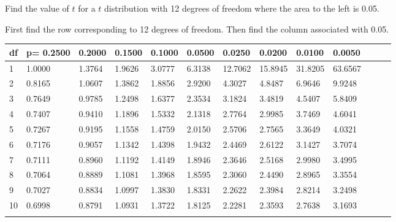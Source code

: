 \begin{frame}{\small Find the value of $t$ for a $t$ distribution with
    12 degrees of freedom where the area to the left is 0.05.}
  
{\small First find the row corresponding to 12 degrees of freedom. Then
find the column associated with 0.05.}

  {
\fontsize{5pt}{5pt}
\selectfont
\begin{tabular}{l|llll>{\columncolor{light-blue}}llllllll} 
df  & p= 0.2500  &  0.2000  &  0.1500  &  0.1000  &  0.0500  &  0.0250  &  0.0200  &  0.0100  &  0.0050   \\\hline 
  1 & 1.0000 & 1.3764 & 1.9626 & 3.0777 & 6.3138 & 12.7062 & 15.8945 & 31.8205 & 63.6567  \\[5pt] \arrayrulecolor{light-gray}\hline\arrayrulecolor{black}  
  2 & 0.8165 & 1.0607 & 1.3862 & 1.8856 & 2.9200 & 4.3027 & 4.8487 & 6.9646 & 9.9248  \\[5pt] \arrayrulecolor{light-gray}\hline\arrayrulecolor{black}  
  3 & 0.7649 & 0.9785 & 1.2498 & 1.6377 & 2.3534 & 3.1824 & 3.4819 & 4.5407 & 5.8409  \\[5pt] \arrayrulecolor{light-gray}\hline\arrayrulecolor{black}  
  4 & 0.7407 & 0.9410 & 1.1896 & 1.5332 & 2.1318 & 2.7764 & 2.9985 & 3.7469 & 4.6041  \\[12pt] \arrayrulecolor{light-gray}\hline\arrayrulecolor{black}  
  5 & 0.7267 & 0.9195 & 1.1558 & 1.4759 & 2.0150 & 2.5706 & 2.7565 & 3.3649 & 4.0321  \\[5pt] \arrayrulecolor{light-gray}\hline\arrayrulecolor{black}  
  6 & 0.7176 & 0.9057 & 1.1342 & 1.4398 & 1.9432 & 2.4469 & 2.6122 & 3.1427 & 3.7074  \\[5pt] \arrayrulecolor{light-gray}\hline\arrayrulecolor{black}  
  7 & 0.7111 & 0.8960 & 1.1192 & 1.4149 & 1.8946 & 2.3646 & 2.5168 & 2.9980 & 3.4995  \\[5pt] \arrayrulecolor{light-gray}\hline\arrayrulecolor{black}  
  8 & 0.7064 & 0.8889 & 1.1081 & 1.3968 & 1.8595 & 2.3060 & 2.4490 & 2.8965 & 3.3554  \\[5pt] \arrayrulecolor{light-gray}\hline\arrayrulecolor{black}  
  9 & 0.7027 & 0.8834 & 1.0997 & 1.3830 & 1.8331 & 2.2622 & 2.3984 & 2.8214 & 3.2498  \\[12pt] \arrayrulecolor{light-gray}\hline\arrayrulecolor{black}  
 10 & 0.6998 & 0.8791 & 1.0931 & 1.3722 & 1.8125 & 2.2281 & 2.3593 & 2.7638 & 3.1693  \\[5pt] \arrayrulecolor{light-gray}\hline\arrayrulecolor{black}  

\end{tabular}}
\end{frame}
